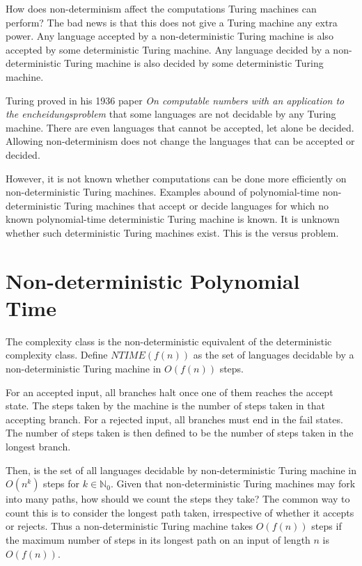 \documentclass{iansnotes}
\begin{document}
  How does non-determinism affect the computations Turing machines can perform?
  The bad news is that this does not give a Turing machine any extra power.
  Any language accepted by a non-deterministic Turing machine is also accepted by some deterministic Turing machine.
  Any language decided by a non-deterministic Turing machine is also decided by some deterministic Turing machine.

  Turing proved in his 1936 paper \emph{On computable numbers with an application to the encheidungsproblem} that some languages are not decidable by any Turing machine.
  There are even languages that cannot be accepted, let alone be decided.
  Allowing non-determinism does not change the languages that can be accepted or decided.

  However, it is not known whether computations can be done more efficiently on non-deterministic Turing machines.
  Examples abound of polynomial-time non-deterministic Turing machines that accept or decide languages for which no known polynomial-time deterministic Turing machine is known.
  It is unknown whether such deterministic Turing machines exist.
  This is the  versus  problem.


\section{Non-deterministic Polynomial Time}
  The  complexity class is the non-deterministic equivalent of the deterministic  complexity class.
  Define $NTIME(f(n))$ as the set of languages decidable by a non-deterministic Turing machine in $O(f(n))$ steps.
  
  For an accepted input, all branches halt once one of them reaches the accept state.
  The steps taken by the machine is the number of steps taken in that accepting branch.
  For a rejected input, all branches must end in the fail states.
  The number of steps taken is then defined to be the number of steps taken in the longest branch.

  Then,  is the set of all languages decidable by non-deterministic Turing machine in $O(n^k)$ steps for $k \in \mathbb{N}_0$.
  Given that non-deterministic Turing machines may fork into many paths, how should we count the steps they take?
  The common way to count this is to consider the longest path taken, irrespective of whether it accepts or rejects.
  Thus a non-deterministic Turing machine takes \(O(f(n))\) steps if the maximum number of steps in its longest path on an input of length \(n\) is \(O(f(n))\).
\end{document}
